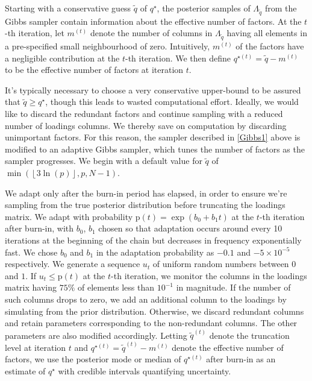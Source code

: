 \documentclass[a4paper,12pt,fleqn]{article}
\numberwithin{equation}{section}
\begin{document}
Starting with a conservative guess $\tilde{q}$ of $q^\star$, the posterior samples of $\Lambda_{\tilde{q}}$ from the Gibbs sampler contain information about the effective number of factors. At the $t$-th iteration, let $m^{\left(t\right)}$ denote the number of columns in $\Lambda_{\tilde{q}}$ having all elements in a pre-specified small neighbourhood of zero. Intuitively, $m^{\left(t\right)}$ of the factors have a negligible contribution at the $t$-th iteration. We then define $q^{\star\left(t\right)} = \tilde{q} - m^{\left(t\right)}$ to be the effective number of factors at iteration $t$.

It's typically necessary to choose a very conservative upper-bound to be assured that $\tilde{q} \geq q^\star$, though this leads to wasted computational effort. Ideally, we would like to discard the redundant factors and continue sampling with a reduced number of loadings columns. We thereby save on computation by discarding unimportant factors. For this reason, the sampler described in \ref{Gibbs1} above is modified to an adaptive Gibbs sampler, which tunes the number of factors as the sampler progresses. We begin with a default value for $\tilde{q}$ of $\min\left(\left\lfloor 3\ln(p)\right\rfloor, p, N-1\right)$.

We adapt only after the burn-in period has elapsed, in order to ensure we're sampling from the true posterior distribution before truncating the loadings matrix. We adapt with probability $\mathrm{p}\left(t\right) = \exp\left(b_0 + b_1t\right)$ at the $t$-th iteration after burn-in, with $b_0$, $b_1$ chosen so that adaptation occurs around every 10 iterations at the beginning of the chain but decreases in frequency exponentially fast. We chose $b_0$ and $b_1$ in the adaptation probability as $-0.1$ and $-5 \times 10^{-5}$ respectively. We generate a sequence $u_t$ of uniform random numbers between $0$ and $1$. If $u_t \leq \mathrm{p}\left(t\right)$ at the $t$-th iteration, we monitor the columns in the loadings matrix having $75\%$ of elements less than $10^{-1}$ in magnitude. If the number of such columns drops to zero, we add an additional column to the loadings by simulating from the prior distribution. Otherwise, we discard redundant columns and retain parameters corresponding to the non-redundant columns. The other parameters are also modified accordingly. Letting $\tilde{q}^{\left(t\right)}$ denote the truncation level at iteration $t$ and $q^{\star\left(t\right)} = \tilde{q}^{\left(t\right)} - m^{\left(t\right)}$ denote the effective number of factors, we use the posterior mode or median of $q^{\star\left(t\right)}$ after burn-in as an estimate of $q^\star$ with credible intervals quantifying uncertainty.
\end{document}
